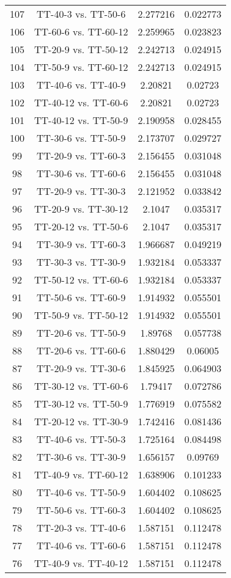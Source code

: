 \documentclass[a4paper,10pt]{article}
\begin{document}
\begin{landscape}
\begin{table}[!htp]
\begin{tabular}{cccc}
107&TT-40-3 vs. TT-50-6&2.277216&0.022773\\
106&TT-60-6 vs. TT-60-12&2.259965&0.023823\\
105&TT-20-9 vs. TT-50-12&2.242713&0.024915\\
104&TT-50-9 vs. TT-60-12&2.242713&0.024915\\
103&TT-40-6 vs. TT-40-9&2.20821&0.02723\\
102&TT-40-12 vs. TT-60-6&2.20821&0.02723\\
101&TT-40-12 vs. TT-50-9&2.190958&0.028455\\
100&TT-30-6 vs. TT-50-9&2.173707&0.029727\\
99&TT-20-9 vs. TT-60-3&2.156455&0.031048\\
98&TT-30-6 vs. TT-60-6&2.156455&0.031048\\
97&TT-20-9 vs. TT-30-3&2.121952&0.033842\\
96&TT-20-9 vs. TT-30-12&2.1047&0.035317\\
95&TT-20-12 vs. TT-50-6&2.1047&0.035317\\
94&TT-30-9 vs. TT-60-3&1.966687&0.049219\\
93&TT-30-3 vs. TT-30-9&1.932184&0.053337\\
92&TT-50-12 vs. TT-60-6&1.932184&0.053337\\
91&TT-50-6 vs. TT-60-9&1.914932&0.055501\\
90&TT-50-9 vs. TT-50-12&1.914932&0.055501\\
89&TT-20-6 vs. TT-50-9&1.89768&0.057738\\
88&TT-20-6 vs. TT-60-6&1.880429&0.06005\\
87&TT-20-9 vs. TT-30-6&1.845925&0.064903\\
86&TT-30-12 vs. TT-60-6&1.79417&0.072786\\
85&TT-30-12 vs. TT-50-9&1.776919&0.075582\\
84&TT-20-12 vs. TT-30-9&1.742416&0.081436\\
83&TT-40-6 vs. TT-50-3&1.725164&0.084498\\
82&TT-30-6 vs. TT-30-9&1.656157&0.09769\\
81&TT-40-9 vs. TT-60-12&1.638906&0.101233\\
80&TT-40-6 vs. TT-50-9&1.604402&0.108625\\
79&TT-50-6 vs. TT-60-3&1.604402&0.108625\\
78&TT-20-3 vs. TT-40-6&1.587151&0.112478\\
77&TT-40-6 vs. TT-60-6&1.587151&0.112478\\
76&TT-40-9 vs. TT-40-12&1.587151&0.112478\\

\end{tabular}
\end{table}
\end{landscape}
\end{document}
